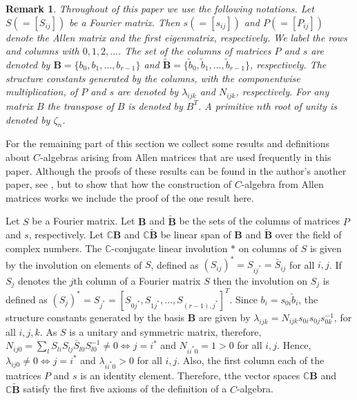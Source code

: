 \documentclass[12pt]{amsart}
\newtheorem{remark}[thm]{Remark}
\begin{document}
\begin{remark}\rm Throughout of this paper we use the following notations. Let $S(=[S_{ij}])$ be a Fourier matrix. Then  $s(=[s_{ij}])$ and $P(=[P_{ij}])$ denote the Allen matrix and the first eigenmatrix, respectively. We label the rows and columns with $0,1,2, \dots$.
The set of the columns of matrices $P$ and $s$ are denoted by ${{\mathbf B}}=\{b_0,b_1,\hdots, b_{r-1}\}$ and $\tilde {{\mathbf B}}=\{\tilde b_0, \tilde b_1,\hdots, \tilde b_{r-1}\}$, respectively. The structure constants generated by the columns, with the componentwise multiplication, of $P$ and $s$ are denoted by $\lambda_{ijk}$ and $N_{ijk}$, respectively. For any matrix $B$  the transpose of $B$ is denoted by $B^T$. A primitive $n$th root of unity is denoted by $\zeta_n$.
\end{remark}

For the remaining part of this section we collect some results and definitions about $C$-algebras arising from Allen matrices that are used frequently in this paper. Although the proofs of these results can be found in the author's another paper, see \cite{G1}, but to show that how the construction of $C$-algebra from Allen matrices works we include the proof of the one result here.

\smallskip

Let $S$ be a Fourier matrix. Let ${{\mathbf B}}$ and $\tilde{{\mathbf B}}$ be the sets of the columns of matrices $P$ and $s$, respectively. Let ${{\mathbb C}}{{\mathbf B}}$ and ${{\mathbb C}}\tilde{{\mathbf B}}$ be linear span of ${{\mathbf B}}$ and $\tilde{{\mathbf B}}$ over the field of  complex numbers. The ${{\mathbb C}}$-conjugate linear involution $*$ on columns of $S$ is given by the involution on elements of $S$,  defined as $(S_{ij})^*=S_{ij^*}=\bar S_{ij}$ for all $i,j$. If $S_j$ denotes the $j$th column of a Fourier matrix $S$ then the involution on $S_j$ is defined as $(S_j)^*=S_{j^*}=[S_{0j^*}, S_{1j^*}, \hdots, S_{(r-1),j^*}]^T$. Since $b_i=s_{0i}\tilde b_{i}$, the structure constants generated by the basis ${{\mathbf B}}$ are given by $\lambda_{ijk}={N_{ijk}s_{0i}s_{0j}}{s^{-1}_{0k}}$, for all $i,j, k$.  As $S$ is a unitary and symmetric matrix, therefore, $N_{ij0}= \sum_l{S_{li}S_{lj}\bar S_{l0}}{S^{-1}_{l0}}\neq 0 \iff j=i^*$ and $N_{ii^*0}=1>0$ for all $i,j$. Hence, $\lambda_{ij0}\neq 0 \iff j=i^*$  and $\lambda_{ii^*0}>0$ for all $i,j$. Also, the first column each of the matrices $P$ and $s$ is an identity element. Therefore, tthe vector spaces ${{\mathbb C}}{{\mathbf B}}$ and ${{\mathbb C}}\tilde{{\mathbf B}}$ satisfy the first five axioms of the definition of a $C$-algebra.
\end{document}
